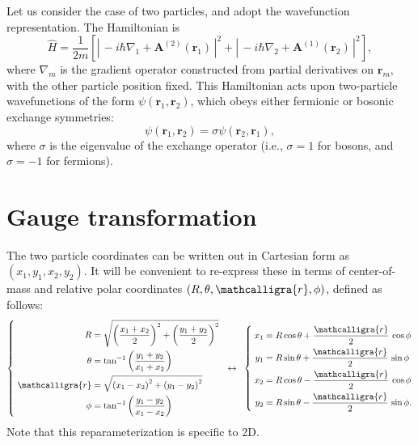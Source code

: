 \documentclass[pra,12pt]{revtex4}
\begin{document}
Let us consider the case of two particles, and adopt the wavefunction
representation.  The Hamiltonian is
\begin{equation}
  \hat{H} = \frac{1}{2m} \left[ \left| \, -i\hbar \nabla_1
  + \mathbf{A}^{(2)}(\mathbf{r}_1)\,\right|^2
  + \left| \, -i\hbar \nabla_2
  + \mathbf{A}^{(1)}(\mathbf{r}_2)\,\right|^2\right],
\end{equation}
where $\nabla_m$ is the gradient operator constructed from partial
derivatives on $\mathbf{r}_m$, with the other particle position fixed.
This Hamiltonian acts upon two-particle wavefunctions of the form
$\psi(\mathbf{r}_1, \mathbf{r}_2)$, which obeys either fermionic or
bosonic exchange symmetries:
\begin{equation}
  \psi(\mathbf{r}_1, \mathbf{r}_2) = \sigma \psi(\mathbf{r}_2, \mathbf{r}_1),
  \label{exchange}
\end{equation}
where $\sigma$ is the eigenvalue of the exchange operator (i.e.,
$\sigma = 1$ for bosons, and $\sigma = -1$ for fermions).

\section{Gauge transformation}

The two particle coordinates can be written out in Cartesian form as
$(x_1, y_1, x_2, y_2)$.  It will be convenient to re-express these in
terms of center-of-mass and relative polar coordinates $(R, \theta,
\mathcalligra{r}, \phi)$, defined as follows:
\begin{align}
  \left\{\;
  \begin{aligned}
  R &= \sqrt{\left(\frac{x_1+x_2}{2}\right)^2 + \left(\frac{y_1+y_2}{2}\right)^2} \\
  \theta &= \tan^{-1}\left(\frac{y_1+y_2}{x_1+x_2}\right) \\
  \mathcalligra{r} &= \sqrt{\left(x_1-x_2\right)^2 + \left(y_1-y_2\right)^2} \\
  \phi &= \tan^{-1}\left(\frac{y_1-y_2}{x_1-x_2}\right)
  \end{aligned}
  \right.
  \;\;\leftrightarrow\;\;
  \left\{ \;
  \begin{aligned}
    x_1 &= R \cos\theta + \frac{\mathcalligra{r}}{2} \,\cos\phi \\
    y_1 &= R \sin\theta + \frac{\mathcalligra{r}}{2} \,\sin\phi \\
    x_2 &= R \cos\theta - \frac{\mathcalligra{r}}{2} \,\cos\phi \\
    y_2 &= R \sin\theta - \frac{\mathcalligra{r}}{2} \,\sin\phi.
  \end{aligned}
  \right.
  \label{reparm}
\end{align}
Note that this reparameterization is specific to 2D.
\end{document}

